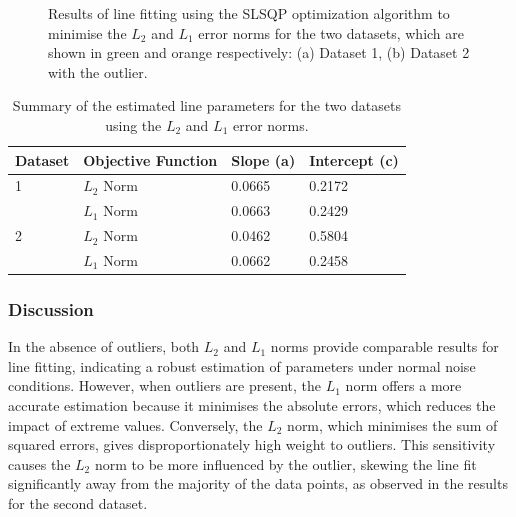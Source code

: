 \documentclass[11pt]{article}
\begin{document}
\begin{figure}[H]
\begin{subfigure}{.45\textwidth}
        \caption{}
        \label{fig:line_fit_2}
    \end{subfigure}%
    \caption{Results of line fitting using the SLSQP optimization algorithm to minimise the \(L_2\) and \(L_1\) error norms for the two datasets, which are shown in green and orange respectively: (a) Dataset 1, (b) Dataset 2 with the outlier.}
    \label{fig:line_fitting_results}
\end{figure}

\begin{table}[H]
    \centering
    \begin{tabular}{@{}llll@{}}
    \toprule
    \textbf{Dataset} & \textbf{Objective Function} & \textbf{Slope (a)} & \textbf{Intercept (c)} \\ \midrule
    1               & \(L_2\) Norm                & 0.0665             & 0.2172                 \\
                    & \(L_1\) Norm                & 0.0663             & 0.2429                 \\ \midrule
    2               & \(L_2\) Norm                & 0.0462             & 0.5804                 \\
                    & \(L_1\) Norm                & 0.0662             & 0.2458                 \\ \bottomrule
    \end{tabular}
    \caption{Summary of the estimated line parameters for the two datasets using the \(L_2\) and \(L_1\) error norms.}
    \label{tab:line_fitting_results}
\end{table}

\subsubsection{Discussion}
In the absence of outliers, both \(L_2\) and \(L_1\) norms provide comparable results for line fitting, indicating a robust estimation of parameters under normal noise conditions. However, when outliers are present, the \(L_1\) norm offers a more accurate estimation because it minimises the absolute errors, which reduces the impact of extreme values. Conversely, the \(L_2\) norm, which minimises the sum of squared errors, gives disproportionately high weight to outliers. This sensitivity causes the \(L_2\) norm to be more influenced by the outlier, skewing the line fit significantly away from the majority of the data points, as observed in the results for the second dataset.
\end{document}
